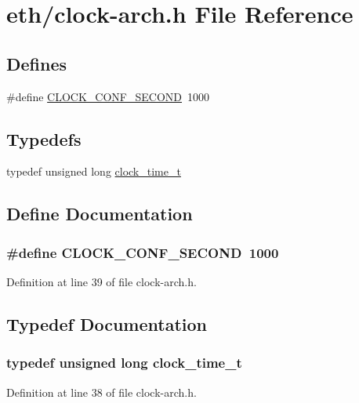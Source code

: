 \hypertarget{clock-arch_8h}{
\section{eth/clock-\/arch.h File Reference}
\label{clock-arch_8h}
}
\subsection*{Defines}
\begin{DoxyCompactItemize}
\item 
\#define \hyperlink{clock-arch_8h_a67300667a43e2ddc14d3ea322892feb9}{CLOCK\_\-CONF\_\-SECOND}~1000
\end{DoxyCompactItemize}
\subsection*{Typedefs}
\begin{DoxyCompactItemize}
\item 
typedef unsigned long \hyperlink{clock-arch_8h_a42fc7b708ad04499c436158fd5f37ed4}{clock\_\-time\_\-t}
\end{DoxyCompactItemize}


\subsection{Define Documentation}
\hypertarget{clock-arch_8h_a67300667a43e2ddc14d3ea322892feb9}{
\subsubsection[{CLOCK\_\-CONF\_\-SECOND}]{\setlength{\rightskip}{0pt plus 5cm}\#define CLOCK\_\-CONF\_\-SECOND~1000}}
\label{clock-arch_8h_a67300667a43e2ddc14d3ea322892feb9}


Definition at line 39 of file clock-\/arch.h.



\subsection{Typedef Documentation}
\hypertarget{clock-arch_8h_a42fc7b708ad04499c436158fd5f37ed4}{
\subsubsection[{clock\_\-time\_\-t}]{\setlength{\rightskip}{0pt plus 5cm}typedef unsigned long {\bf clock\_\-time\_\-t}}}
\label{clock-arch_8h_a42fc7b708ad04499c436158fd5f37ed4}


Definition at line 38 of file clock-\/arch.h.

